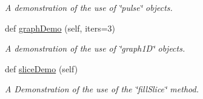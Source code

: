 \begin{DoxyCompactItemize}
\begin{DoxyCompactList}\small\item\em A demonstration of the use of \char`\"{}pulse\char`\"{} objects. \end{DoxyCompactList}\item 
def \hyperlink{classglowbit_1_1stick_a7f45fb8bf324841b710a215b1b2e3a1c}{graph\+Demo} (self, iters=3)
\begin{DoxyCompactList}\small\item\em A demonstration of the use of \char`\"{}graph1\+D\char`\"{} objects. \end{DoxyCompactList}\item 
def \hyperlink{classglowbit_1_1stick_a26eedb25d40d67d1e2ca786a7b8eb8b0}{slice\+Demo} (self)
\begin{DoxyCompactList}\small\item\em A Demonstration of the use of the \char`\"{}fill\+Slice\char`\"{} method. \end{DoxyCompactList}\end{DoxyCompactItemize}
